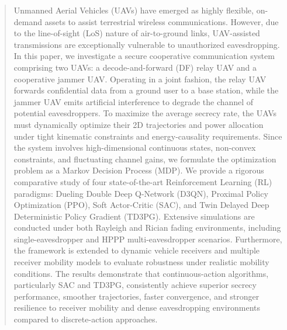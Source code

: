 \documentclass[journal,onecolumn]{IEEEtran}
\begin{document}
\begin{abstract}
Unmanned Aerial Vehicles (UAVs) have emerged as highly flexible, on-demand assets to assist terrestrial wireless communications. However, due to the line-of-sight (LoS) nature of air-to-ground links, UAV-assisted transmissions are exceptionally vulnerable to unauthorized eavesdropping. In this paper, we investigate a secure cooperative communication system comprising two UAVs: a decode-and-forward (DF) relay UAV and a cooperative jammer UAV. Operating in a joint fashion, the relay UAV forwards confidential data from a ground user to a base station, while the jammer UAV emits artificial interference to degrade the channel of potential eavesdroppers. To maximize the average secrecy rate, the UAVs must dynamically optimize their 2D trajectories and power allocation under tight kinematic constraints and energy-causality requirements. Since the system involves high-dimensional continuous states, non-convex constraints, and fluctuating channel gains, we formulate the optimization problem as a Markov Decision Process (MDP). We provide a rigorous comparative study of four state-of-the-art Reinforcement Learning (RL) paradigms: Dueling Double Deep Q-Network (D3QN), Proximal Policy Optimization (PPO), Soft Actor-Critic (SAC), and Twin Delayed Deep Deterministic Policy Gradient (TD3PG). Extensive simulations are conducted under both Rayleigh and Rician fading environments, including single-eavesdropper and HPPP multi-eavesdropper scenarios. Furthermore, the framework is extended to dynamic vehicle receivers and multiple receiver mobility models to evaluate robustness under realistic mobility conditions. The results demonstrate that continuous-action algorithms, particularly SAC and TD3PG, consistently achieve superior secrecy performance, smoother trajectories, faster convergence, and stronger resilience to receiver mobility and dense eavesdropping environments compared to discrete-action approaches.


\end{abstract}
\end{document}
